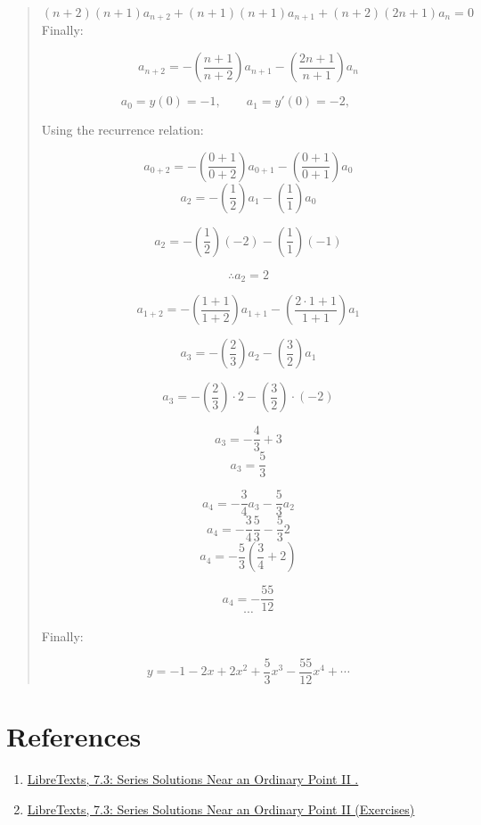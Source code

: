 \documentclass[
  letterpaper,
  DIV=11,
  numbers=noendperiod]{scrreprt}
\theoremstyle{plain}
\theoremstyle{remark}
\begin{document}
\begin{tcolorbox}
\begin{quote}
\[(n+2)(n+1)a_{n+2} + (n+1)(n+1)a_{n+1}+(n+2)(2n+1)a_n=0\] Finally:

\[\boxed{a_{n+2}=-\left(\frac{n+1}{n+2}\right)a_{n+1}-\left(\frac{2n+1}{n+1}\right)a_{n}}\]

\[a_0=y(0)=-1,\qquad a_1=y'(0)=-2,\qquad\]

Using the recurrence relation:

\[a_{0+2}=-\left(\frac{0+1}{0+2}\right)a_{0+1}-\left(\frac{0+1}{0+1}\right)a_{0}\]
\[a_{2}=-\left(\frac{1}{2}\right)a_{1}-\left(\frac{1}{1}\right)a_{0}\]

\[a_{2}=-\left(\frac{1}{2}\right)(-2)-\left(\frac{1}{1}\right)(-1)\]

\[\therefore\boxed{a_{2}=2}\]

\[a_{1+2}=-\left(\frac{1+1}{1+2}\right)a_{1+1}-\left(\frac{2\cdot 1+1}{1+1}\right)a_{1}\]

\[a_{3}=-\left(\frac{2}{3}\right)a_{2}-\left(\frac{3}{2}\right)a_{1}\]

\[a_{3}=-\left(\frac{2}{3}\right)\cdot 2-\left(\frac{3}{2}\right)\cdot (-2)\]

\[a_{3}=-\frac{4}{3}+3\] \[\boxed{a_{3}=\frac{5}{3}}\]

\[a_{4}=-\frac{3}{4}a_3-\frac{5}{3}a_2\]
\[a_4=-\frac{3}{4}\frac{5}{3}-\frac{5}{3}2\]
\[a_4=-\frac{5}{3}\left(\frac{3}{4}+2\right)\]

\[\boxed{a_4=-\frac{55}{12}}\] \[\cdots\]

Finally:

\[\boxed{y=-1-2x+2x^2+\frac{5}{3}x^3-\frac{55}{12}x^4+\cdots} \]
\end{quote}

\end{tcolorbox}

\section{References}\label{references-2}

\begin{enumerate}
\def\labelenumi{\arabic{enumi}.}
\item
  \href{https://math.libretexts.org/Courses/Monroe_Community_College/MTH_225_Differential_Equations/7\%3A_Series_Solutions_of_Linear_Second_Order_Equations/7.3\%3A_Series_Solutions_Near_an_Ordinary_Point_II}{LibreTexts,
  7.3: Series Solutions Near an Ordinary Point II .}
\item
  \href{https://math.libretexts.org/Courses/Monroe_Community_College/MTH_225_Differential_Equations/7\%3A_Series_Solutions_of_Linear_Second_Order_Equations/7.3\%3A_Series_Solutions_Near_an_Ordinary_Point_II/7.4.1\%3A_Series_Solutions_Near_an_Ordinary_Point_II_(Exercises)}{LibreTexts,
  7.3: Series Solutions Near an Ordinary Point II (Exercises)}
\end{enumerate}
\end{document}
